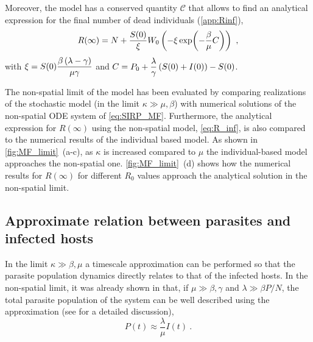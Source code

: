Moreover, the model has a conserved quantity $\mathcal{C}$
\cite{GimenezRomero2021} that allows to find an analytical expression for the
final number of dead individuals (\cref{app:Rinf}),
\begin{equation}\label{eq:R_inf}
    R(\infty)=N+\frac{S(0)}{\xi}W_0\left(-\xi\exp(-\frac{\beta}{\mu}C)\right) \
    ,
\end{equation}
with $\displaystyle\xi=S(0)\frac{\beta\left(\lambda-\gamma\right)}{\mu\gamma}$
and $\displaystyle C=P_0+\frac{\lambda}{\gamma}\left(S(0)+I(0)\right)-S(0)$.

The non-spatial limit of the model has been evaluated by comparing realizations
of the stochastic model (in the limit $\kappa\gg\mu,\beta$) with numerical
solutions of the non-spatial ODE system of \cref{eq:SIRP_MF}. Furthermore, the
analytical expression for $R(\infty)$ using the non-spatial model,
\cref{eq:R_inf}, is also compared to the numerical results of the individual
based model. As shown in \cref{fig:MF_limit}~\textcolor{ref_color}{(a-c)}, as
$\kappa$ is increased
compared to $\mu$ the individual-based model approaches the non-spatial one.
\cref{fig:MF_limit}~\textcolor{ref_color}{(d)} shows how the numerical results
for $R(\infty)$ for
different $R_0$ values approach the analytical solution in the non-spatial
limit.

\subsection{Approximate relation between parasites and infected hosts}

In the limit $\kappa\gg\beta,\mu$ a timescale approximation can be
performed so that the parasite population dynamics directly relates to that of
the infected hosts. In the non-spatial limit, it was already shown in
\cite{GimenezRomero2021} that, if  $\mu\gg\beta,\gamma$ and $\lambda\gg\beta
    P/N$, the total parasite population of the system can be well described
using the approximation (see \cite{GimenezRomero2021} for a detailed
discussion),
\begin{equation}\label{eq:P_approx_II}
    P(t)\approx \frac{\lambda}{\mu} I(t) \ .
\end{equation}


